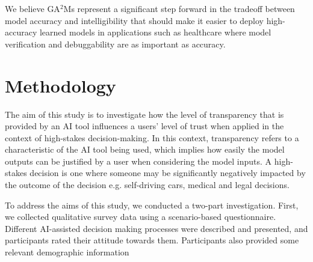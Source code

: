\documentclass[manuscript,screen,review]{acmart}
\begin{document}
We believe GA$^2$Ms represent a significant step forward in the tradeoff between model accuracy and intelligibility that should make it easier to deploy high-accuracy learned models in applications such
as healthcare where model verification and debuggability are as important as accuracy.\cite{Caruana2015}



\section{Methodology}\label{sec:methodology}


The aim of this study is to investigate how the level of transparency that is provided by an AI tool influences a users' level of trust when applied in the context of high-stakes decision-making. In this context, transparency refers to a characteristic of the AI tool being used, which implies how easily the model outputs can be justified by a user when considering the model inputs. A high-stakes decision is one where someone may be significantly negatively impacted by the outcome of the decision e.g. self-driving cars, medical and legal decisions.

To address the aims of this study, we conducted a two-part investigation. First, we collected qualitative survey data using a scenario-based questionnaire. Different AI-assisted decision making processes were described and presented, and participants rated their attitude towards them. Participants also provided some relevant demographic information

\end{document}
